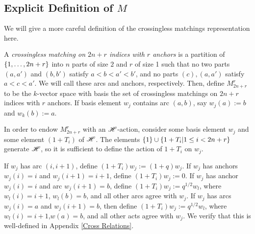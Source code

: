 \documentclass{amsart}
\begin{document}
\subsection{Explicit Definition of $M$}\label{Explicit Definition}
We will give a more careful definition of the crossingless matchings representation here.
\begin{definition}
  A \emph{crossingless matching on $2n+r$ indices with $r$ anchors} is a partition of $\left\{ 1,\dots,2n+r \right\}$ into $n$ parts of size $2$ and $r$ of size 1 such that no two parts $(a,a')$ and $(b,b')$ satisfy $a < b < a' < b'$, and no parts $(c), (a,a')$ satisfy $a < c < a'$.
  We will call these arcs and anchors, respectively.
  Then, define $M^r_{2n+r}$ to be the $k$-vector space with basis the set of crossingless matchings on $2n+r$ indices with $r$ anchors.
  If basis element $w_j$ contains arc $(a,b)$, say $w_j(a) := b$ and $w_k(b) := a$.

  In order to endow $M^r_{2n + r}$ with an $\mathscr{H}$-action, consider some basis element $w_j$ and some element $(1 + T_i)$ of $\mathscr{H}$.
  The elements $\left\{ 1 \right\} \cup \left\{ 1 + T_i | 1 \leq i < 2n + r \right\}$ generate $\mathscr{H}$, so it is sufficient to define the action of $1 + T_i$ on $w_j$.

  If $w_j$ has arc $(i,i+1)$, define $(1 + T_i)w_j := (1 + q)w_j$.
  If $w_j$ has anchors $w_j(i) = i$ and $w_j(i+1) = i+1$, define $(1 + T_i)w_j := 0$.
  If $w_j$ has anchor $w_j(i) = i$ and arc $w_j(i+1) = b$, define $(1 + T_i)w_j := q^{1/2}w_l$, where $w_l(i) = i+1$, $w_l(b) = b$, and all other arcs agree with $w_j$.
  If $w_j$ has arcs $w_j(i) = a$ and $w_j(i+1) = b$, then define $(1 + T_i)w_j := q^{1/2}w_l$, where $w_l(i) = i+1$,$w(a) = b$, and all other acts agree with $w_j$. 
  We verify that this is well-defined in Appendix \ref{Cross Relations}.
\end{definition}
\end{document}
